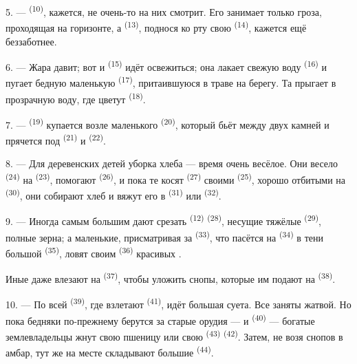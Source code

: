 5. ---  \textsuperscript{(10)}, кажется, не очень-то на них
смотрит. Его занимает только гроза, проходящая на горизонте, а
 \textsuperscript{(13)}, поднося ко рту свою 
\textsuperscript{(14)}, кажется ещё беззаботнее.

6. --- Жара давит; вот и  \textsuperscript{(15)} идёт освежиться;
она лакает свежую воду  \textsuperscript{(16)} и пугает бедную
маленькую  \textsuperscript{(17)}, притаившуюся в траве на
берегу. Та прыгает в прозрачную воду, где цветут 
\textsuperscript{(18)}.

7. ---  \textsuperscript{(19)} купается возле маленького
 \textsuperscript{(20)}, который бьёт между двух камней и прячется
под  \textsuperscript{(21)} и  \textsuperscript{(22)}.

\VUsaut{5.0mm}
\VUsaut{3.4mm}

8. --- Для деревенских детей уборка хлеба --- время очень весёлое. Они
весело  \textsuperscript{(24)} на 
\textsuperscript{(23)}, помогают  \textsuperscript{(26)}, и пока те
косят  \textsuperscript{(27)} своими  \textsuperscript{(25)},
хорошо отбитыми на  \textsuperscript{(30)}, они собирают хлеб и
вяжут его в  \textsuperscript{(31)} или 
\textsuperscript{(32)}.

9. --- Иногда самым большим дают срезать  \textsuperscript{(12)}
 \textsuperscript{(28)}, несущие тяжёлые 
\textsuperscript{(29)}, полные зерна; а маленькие, присматривая за
 \textsuperscript{(33)}, что пасётся на 
\textsuperscript{(34)} в тени большой  \textsuperscript{(35)}, ловят
своим  \textsuperscript{(36)} красивых .

Иные даже влезают на  \textsuperscript{(37)}, чтобы уложить снопы,
которые им подают на  \textsuperscript{(38)}.

10. --- По всей  \textsuperscript{(39)}, где взлетают
 \textsuperscript{(41)}, идёт большая суета. Все заняты жатвой.
Но пока бедняки по-прежнему берутся за старые орудия ---  и  \textsuperscript{(40)} --- богатые землевладельцы жнут
свою пшеницу или свою  \textsuperscript{(43)}  \textsuperscript{(42)}. Затем, не возя снопов в амбар, тут же на месте
складывают большие  \textsuperscript{(44)}.

